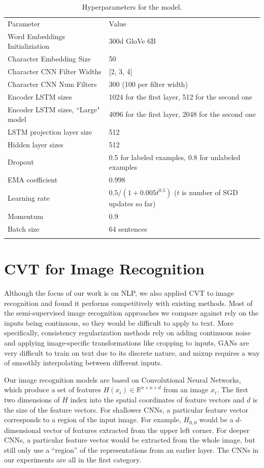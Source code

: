 \documentclass[11pt,a4paper]{article}
\newcommand\Tstrut{\rule{0pt}{2.6ex}}         %
\newcommand\Bstrut{\rule[-1.0ex]{0pt}{0pt}}   %
\newcommand{\thinline}{\Xhline{1.0\arrayrulewidth}}
\newcommand{\thickline}{\Xhline{2.5\arrayrulewidth}}
\newcommand{\tsep}	{\Bstrut \\ \thinline}
\newcommand{\ttop}{\thickline}
\newcommand{\tbottom}{\Bstrut \\ \thickline}
\newcommand{\xhdr}[1]{\vspace{1.7mm}\noindent{{\bf #1.}}}
\begin{document}
\begin{table}[t!]
\begin{tabular}{l l}
\ttop
Parameter & Value\Tstrut\tsep
Word Embeddings Initializiation & 300d GloVe 6B \Tstrut\\
Character Embedding Size & 50 \\
Character CNN Filter Widths & [2, 3, 4] \\
Character CNN Num Filters & 300 (100 per filter width) \\
Encoder LSTM sizes & 1024 for the first layer, 512 for the second one \\
Encoder LSTM sizes, ``Large" model & 4096 for the first layer, 2048 for the second one \\
LSTM projection layer size & 512 \\
Hidden layer sizes & 512  \\
Dropout & 0.5 for labeled examples, 0.8 for unlabeled examples\\
EMA coefficient & 0.998\\
Learning rate & $0.5 / (1 + 0.005t^{0.5})$ ($t$ is number of SGD updates so far)\\
Momentum & 0.9 \\
Batch size & 64 sentences\tbottom
\end{tabular}
\caption{Hyperparameters for the model.}
\label{tab:hyper}
\end{table}


\section{CVT for Image Recognition}
\label{sec:img}

Although the focus of our work is on NLP, we also applied CVT to image recognition and found it performs competitively with existing methods. Most of the semi-supervised image recognition approaches we compare against rely on the inputs being continuous, so they would be difficult to apply to text. More specifically, consistency regularization methods \citep{sajjadi2016regularization, laine2016temporal, miyato2017virtual} rely on adding continuous noise and applying image-specific transformations like cropping to inputs, GANs \citep{salimans2016improved, wei2018improving} are very difficult to train on text due to its discrete nature, and mixup \citep{zhang2017mixup, verma2018manifold} requires a way of smoothly interpolating between different inputs. 

\xhdr{Approach}
Our image recognition models are based on Convolutional Neural Networks, which produce a set of features $H(x_i) \in \mathbb{R}^{n \times n \times d}$ from an image $x_i$.
The first two dimensions of $H$ index into the spatial coordinates of feature vectors and $d$ is the size of the feature vectors.
For shallower CNNs, a particular feature vector corresponds to a region of the input image.
For example, $H_{0, 0}$ would be a $d$-dimensional vector of features extracted from the upper left corner.
For deeper CNNs, a particular feature vector would be extracted from the whole image, but still only use a ``region'' of the representations from an earlier layer.
The CNNs in our experiments are all in the first category.
\end{document}
